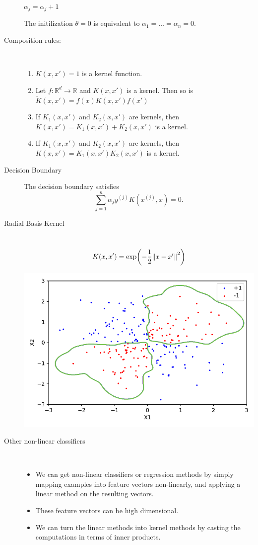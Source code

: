 \documentclass[10pt,landscape,a4paper]{article}
\begin{document}
\begin{multicols*}{3}
\begin{description}
\begin{algorithm}[H]
{\begin{algorithmic}
				\State $\alpha_j=\alpha_j+1$
				\EndIf
				\EndFor
				\EndFor
				\EndProcedure
			\end{algorithmic}
		}
	\end{algorithm}
	\vspace*{-2em}
	The initilization $\theta=0$ is equivalent to $\alpha_1=\dots=\alpha_n=0$.
	\item[Composition rules:] ~
	\begin{enumerate}
		\item $K(x,x')=1$ is a kernel function.
		\item Let $f:\mathbb{R}^d\rightarrow\mathbb{R}$ and $K(x,x')$ is a kernel. Then so is $\widetilde{K}(x,x')=f(x)K(x,x')f(x')$
		\item If $K_1(x,x')$ and $K_2(x,x')$ are kernels, then $K(x,x')=K_1(x,x')+K_2(x,x')$ is a kernel.
		\item If $K_1(x,x')$ and $K_2(x,x')$ are kernels, then $K(x,x')=K_1(x,x')K_2(x,x')$ is a kernel.
	\end{enumerate}
	\item[Decision Boundary] The decision boundary satisfies
	$$\sum_{j=1}^{n}\alpha_jy^{(j)}K\left(x^{(j)},x\right)=0.$$
	\item[Radial Basis Kernel] ~
	$$K(x,x')=\exp(-\frac{1}{2}\norm{x-x'}^2)$$
	\begin{center}
		\includegraphics[width=0.6\columnwidth]{rbf.pdf}
	\end{center}
	\item[Other non-linear classifiers] ~
	\begin{itemize}
		\item We can get non-linear classifiers or regression methods by simply mapping examples into feature vectors non-linearly, and applying a linear method on the resulting vectors.
		\item These feature vectors can be high dimensional.
		\item We can turn the linear methods into kernel methods by casting the computations in terms of inner products.
	\end{itemize}
\end{description}


\end{multicols*}
\end{document}
